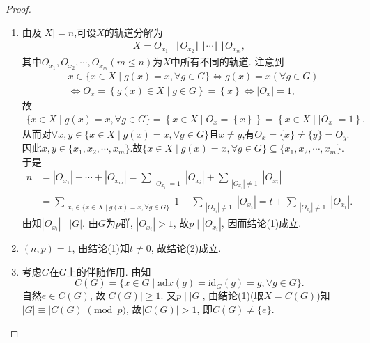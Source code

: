 \documentclass[../../main.tex]{subfiles}%
\begin{document}
\begin{proof}
\begin{enumerate}[(1)]
\item 由及$|X|=n$,可设$X$的轨道分解为
\begin{align*}
X=O_{x_1}\bigsqcup O_{x_2}\bigsqcup\cdots\bigsqcup O_{x_m},
\end{align*}
其中$O_{x_1},O_{x_2},\cdots,O_{x_m}(m\leqslant n)$为$X$中所有不同的轨道.
注意到
\begin{align*}
&x\in \{x\in X\mid g(x)=x,\forall g\in G\}\Longleftrightarrow g(x)=x(\forall g\in G)
\\
&\Longleftrightarrow O_x=\left\{ g\left( x \right) \in X\mid g\in G \right\} =\left\{ x \right\} \Longleftrightarrow |O_x|=1,
\end{align*}
故
\begin{align}\label{eq::98h20jf30tuj3pg34}
\{x\in X\mid g(x)=x,\forall g\in G\}=\left\{ x\in X\mid O_x=\left\{ x \right\} \right\} =\left\{ x\in X\mid |O_x|=1 \right\}.
\end{align}
从而对$\forall x,y\in \{x\in X\mid g(x)=x,\forall g\in G\}$且$x\ne y$,有$O_x=\{x\}\ne \{y\}=O_y$.因此$x,y\in \{x_1,x_2,\cdots ,x_m\}$.故$\{x\in X\mid g(x)=x,\forall g\in G\}\subseteq \{x_1,x_2,\cdots ,x_m\}$.
于是
\begin{align*}
n&=\left| O_{x_1} \right|+\cdots +\left| O_{x_m} \right|=\sum_{\substack{|O_{x_i}|= 1}} |O_{x_i}|+\sum_{\substack{|O_{x_i}|\neq 1}} |O_{x_i}|
\\
&=\sum_{\substack{x_i\in \{x\in X\mid g(x)=x,\forall g\in G\}}} 1+\sum_{\substack{|O_{x_i}|\neq 1}} |O_{x_i}|=t+\sum_{\substack{|O_{x_i}|\neq 1}} |O_{x_i}|.
\end{align*}
由知$|O_{x_i}|\mid |G|$. 由$G$为$p$群, $|O_{x_i}|>1$, 故$p\mid |O_{x_i}|$, 因而结论(1)成立.
\item $(n,p)=1$, 由结论(1)知$t\neq 0$, 故结论(2)成立.
\item 考虑$G$在$G$上的伴随作用. 由知
$$
C(G)=\{x\in G\mid \mathrm{ad}x\left( g \right) =\mathrm{id}_G\left( g \right)=g ,\forall g\in G\}.
$$
自然$e\in C(G)$, 故$|C(G)|\geqslant 1$. 又$p\mid |G|$, 由结论(1)(取$X=C(G)$)知$|G|\equiv |C(G)|\pmod{p}$, 故$|C(G)|>1$, 即$C(G)\neq \{e\}$.
\end{enumerate}
\end{proof}
\end{document}

